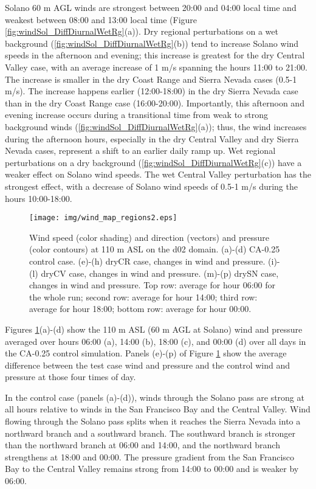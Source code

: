 Solano 60 m AGL winds are strongest between 20:00 and 04:00 local time and weakest between 08:00 and 13:00 local time (Figure \ref{fig:windSol_DiffDiurnalWetRg}(a)).  Dry regional perturbations on a wet background (\ref{fig:windSol_DiffDiurnalWetRg}(b)) tend to increase Solano wind speeds in the afternoon and evening; this increase is greatest for the dry Central Valley case, with an average increase of 1 m/s spanning the hours 11:00 to 21:00.  The increase is smaller in the dry Coast Range and Sierra Nevada cases (0.5-1 m/s).  The increase happens earlier (12:00-18:00) in the dry Sierra Nevada case than in the dry Coast Range case (16:00-20:00).  Importantly, this afternoon and evening increase occurs during a transitional time from weak to strong background winds (\ref{fig:windSol_DiffDiurnalWetRg}(a)); thus, the wind increases during the afternoon hours, especially in the dry Central Valley and dry Sierra Nevada cases, represent a shift to an earlier daily ramp up.  Wet regional perturbations on a dry background (\ref{fig:windSol_DiffDiurnalWetRg}(c)) have a weaker effect on Solano wind speeds.  The wet Central Valley perturbation has the strongest effect, with a decrease of Solano wind speeds of 0.5-1 m/s during the hours 10:00-18:00.

\begin{figure}[here]
\texttt{[image: img/wind\_map\_regions2.eps]}
\caption{Wind speed (color shading) and direction (vectors) and pressure (color contours) at 110 m ASL on the d02 domain.  (a)-(d) CA-0.25 control case.  (e)-(h) dryCR case, changes in wind and pressure.  (i)-(l) dryCV case, changes in wind and pressure.  (m)-(p) drySN case, changes in wind and pressure.  Top row: average for hour 06:00 for the whole run; second row: average for hour 14:00; third row: average for hour 18:00; bottom row: average for hour 00:00.}
\label{fig:windSol_WindMapsRg}
\end{figure}

Figures \ref{fig:windSol_WindMapsRg}(a)-(d) show the 110 m ASL (60 m AGL at Solano) wind and pressure averaged over hours 06:00 (a), 14:00 (b), 18:00 (c), and 00:00 (d) over all days in the CA-0.25 control simulation. Panels (e)-(p) of Figure \ref{fig:windSol_WindMapsRg} show the average difference between the test case wind and pressure and the control wind and pressure at those four times of day.  

In the control case (panels (a)-(d)), winds through the Solano pass are strong at all hours relative to winds in the San Francisco Bay and the Central Valley.  Wind flowing through the Solano pass splits when it reaches the Sierra Nevada into a northward branch and a southward branch.  The southward branch is stronger than the northward branch at 06:00 and 14:00, and the northward branch strengthens at 18:00 and 00:00.  The pressure gradient from the San Francisco Bay to the Central Valley remains strong from 14:00 to 00:00 and is weaker by 06:00.

